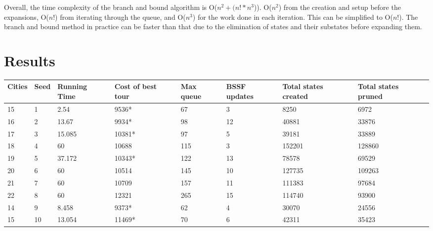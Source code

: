 \documentclass[11pt]{report} %
\begin{document}
Overall, the time complexity of the branch and bound algorithm is O($n^2 + (n! * n^3$)).  O($n^2$) from the creation and setup before the expansions, O($n!$) from iterating through the queue, and O($n^3$) for the work done in each iteration.  This can be simplified to O($n!$).  The branch and bound method in practice can be faster than that due to the elimination of states and their substates before expanding them.

\section*{Results}

\begin{tabular}{|p{1cm}|p{1cm}|p{1.5cm}|p{1.5cm}|p{1.5cm}|p{1.5cm}|p{1.5cm}|p{1.5cm}|}
    \hline
    Cities & Seed & Running Time & Cost of best tour & Max queue & BSSF updates & Total states created & Total states pruned \\
    \hline
    15     & 1    & 2.54         & 9536*             & 67        & 3            & 8250                 & 6972                \\
    \hline
    16     & 2    & 13.67        & 9934*             & 98        & 12           & 40881                & 33876               \\
    \hline
    17     & 3    & 15.085       & 10381*            & 97        & 5            & 39181                & 33889               \\
    \hline
    18     & 4    & 60           & 10688             & 115       & 3            & 152201               & 128860              \\
    \hline
    19     & 5    & 37.172       & 10343*            & 122       & 13           & 78578                & 69529               \\
    \hline
    20     & 6    & 60           & 10514             & 145       & 10           & 127735               & 109263              \\
    \hline
    21     & 7    & 60           & 10709             & 157       & 11           & 111383               & 97684               \\
    \hline
    22     & 8    & 60           & 12321             & 265       & 15           & 114740               & 93900               \\
    \hline
    14     & 9    & 8.458        & 9373*             & 62        & 4            & 30070                & 24556               \\
    \hline
    15     & 10   & 13.054       & 11469*            & 70        & 6            & 42311                & 35423               \\
    \hline
\end{tabular}
\end{document}

